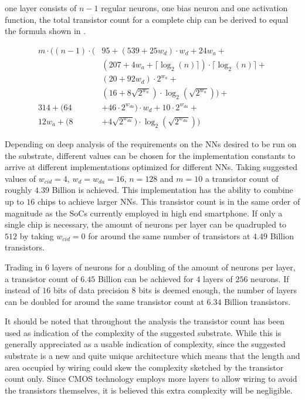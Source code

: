  one layer consists of $n - 1$ regular neurons, one bias neuron and one activation function, the total transistor count for a complete chip can be derived to equal the formula shown in .

\begin{align*}
  m \cdot \Bigg(
  (n - 1) \cdot \Big(&95 + (539 + 25w_{d}) \cdot w_{d} + 24w_{a} +\\
                     &(207 + 4w_{a} + \lceil\log_{2}(n)\rceil) \cdot \lceil\log_{2}(n)\rceil +\\
                     &(20 + 92w_{d}) \cdot 2^{w_{a}} + \\
                     &(16 + 8\sqrt{2^{w_{a}}}) \cdot \log_{2}(\sqrt{2^{w_{a}}})\Big) +\\
  314 + (64 &+ 46 \cdot 2^{w_{da}}) \cdot w_{d} + 10 \cdot 2^{w_{da}} +\\
  12w_{a} + (8 &+ 4\sqrt{2^{w_{da}}}) \cdot \log_{2}(\sqrt{2^{w_{da}}})
  \Bigg)\tag{\theequation}\label{eqn:total}
\end{align*}

Depending on deep analysis of the requirements on the \acp{NN} desired to be run on the substrate, different values can be chosen for the implementation constants to arrive at different implementations optimized for different \acp{NN}. Taking suggested values of $w_{cid} = 4$, $w_{d} = w_{da} = 16$, $n = 128$ and $m = 10$ a transistor count of roughly $4.39$ Billion is achieved. This implementation has the ability to combine up to $16$ chips to achieve larger \acp{NN}. This transistor count is in the same order of magnitude as the \acp{SoC} currently employed in high end smartphone\cite{huawei}. If only a single chip is necessary, the amount of neurons per layer can be quadrupled to $512$ by taking $w_{cid} = 0$ for around the same number of transistors at $4.49$ Billion transistors.

Trading in $6$ layers of neurons for a doubling of the amount of neurons per layer, a transistor count of $6.45$ Billion can be achieved for $4$ layers of $256$ neurons. If instead of $16$ bits of data precision $8$ bits is deemed enough, the number of layers can be doubled for around the same transistor count at $6.34$ Billion transistors.

It should be noted that throughout the analysis the transistor count has been used as indication of the complexity of the suggested substrate. While this is generally appreciated as a usable indication of complexity, since the suggested substrate is a new and quite unique architecture which means that the length and area occupied by wiring could skew the complexity sketched by the transistor count only. Since \ac{CMOS} technology employs more layers to allow wiring to avoid the transistors themselves, it is believed this extra complexity will be negligible.

